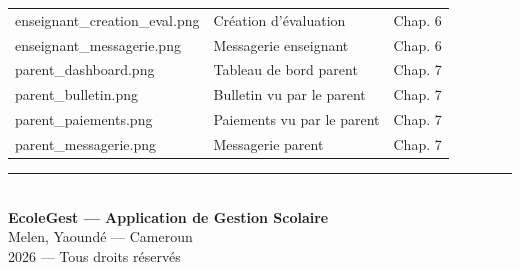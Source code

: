 \documentclass[12pt, a4paper, twoside, openright]{report}
\begin{document}
\begin{table}[htbp]
\begin{tabularx}{\textwidth}{>{\ttfamily\small}p{5.5cm} X l}
    enseignant\_creation\_eval.png & Création d'évaluation & Chap. 6 \\
    enseignant\_messagerie.png & Messagerie enseignant & Chap. 6 \\
    parent\_dashboard.png & Tableau de bord parent & Chap. 7 \\
    parent\_bulletin.png & Bulletin vu par le parent & Chap. 7 \\
    parent\_paiements.png & Paiements vu par le parent & Chap. 7 \\
    parent\_messagerie.png & Messagerie parent & Chap. 7 \\
    \bottomrule
  \end{tabularx}
\end{table}


\vfill
\begin{center}
  \rule{6cm}{0.5pt}\\[10pt]
  {\large\textbf{EcoleGest — Application de Gestion Scolaire}}\\[4pt]
  {\small Melen, Yaoundé — Cameroun}\\[4pt]
  {\small\textcopyright{} 2026 — Tous droits réservés}
\end{center}
\end{document}
